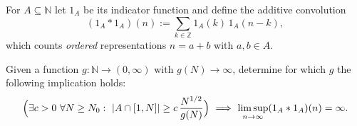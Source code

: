 For $A\subseteq\mathbb N$ let $1_A$ be its indicator function and define the additive convolution
\[
(1_A*1_A)(n):=\sum_{k\in\mathbb Z}1_A(k)\,1_A(n-k),
\]
which counts \emph{ordered} representations $n=a+b$ with $a,b\in A$.

Given a function $g:\mathbb N\to(0,\infty)$ with $g(N)\to\infty$, determine for which $g$ the following implication holds:
\[
\Bigl(\exists c>0\ \forall N\ge N_0:\ |A\cap[1,N]|\ge c\,\frac{N^{1/2}}{g(N)}\Bigr)\ \Longrightarrow\ \limsup_{n\to\infty}(1_A*1_A)(n)=\infty.
\]
